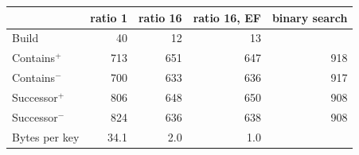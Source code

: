 \begin{tabular}{lrrrr}
&\multicolumn{1}{c}{ratio 1}&\multicolumn{1}{c}{ratio 16}&\multicolumn{1}{c}{ratio 16, EF}&\multicolumn{1}{c}{binary search}\\
\hline
Build & 40 & 12 & 13 & \\
Contains$^+$ & 713 & 651 & 647 & 918\\
Contains$^-$ & 700 & 633 & 636 & 917\\
Successor$^+$ & 806 & 648 & 650 & 908\\
Successor$^-$ & 824 & 636 & 638 & 908\\
\hline
Bytes per key & 34.1 & 2.0 & 1.0 & \\
\end{tabular}
